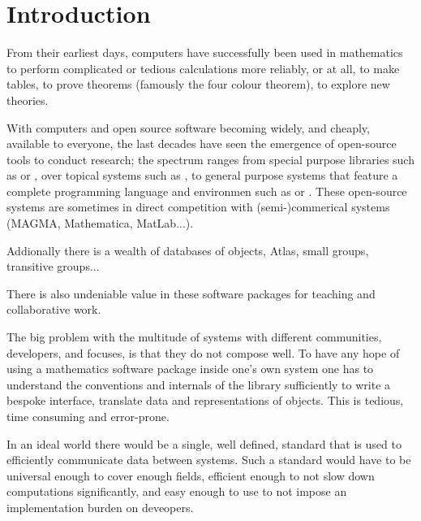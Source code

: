 

\section{Introduction}

From their earliest days, computers have successfully been used in mathematics
to perform complicated or tedious calculations more reliably, or at all, to make
tables, to prove theorems (famously the four colour theorem), to explore new
theories.

With computers and open source software becoming widely, and cheaply, available
to everyone, the last decades have seen the emergence of open-source tools to
conduct research; the spectrum ranges from special purpose libraries such as
\MPIR or \Linbox, over topical systems such as \Singular, to general purpose
systems that feature a complete programming language and environmen such as
\GAP or \Sage.
These open-source systems are sometimes in direct competition with
(semi-)commerical systems (MAGMA, Mathematica, MatLab...).

Addionally there is a wealth of databases of objects, Atlas, small groups, transitive groups...

There is also undeniable value in these software packages for teaching and
collaborative work.

The big problem with the multitude of systems with different communities,
developers, and focuses, is that they do not compose well. To have any hope of
using a mathematics software package inside one's own system one has to
understand the conventions and internals of the library sufficiently to write a
bespoke interface, translate data and representations of objects. This is
tedious, time consuming and error-prone.

In an ideal world there would be a single, well defined, standard that is used
to efficiently communicate data between systems.
Such a standard would have to be universal enough to cover enough fields,
efficient enough to not slow down computations significantly, and easy enough to
use to not impose an implementation burden on deveopers.

